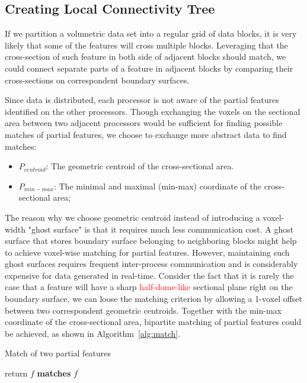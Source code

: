 \subsection{Creating Local Connectivity Tree}

If we partition a volumetric data set into a regular grid of data blocks, it is very likely that some of the features will cross multiple blocks. Leveraging that the cross-section of such feature in both side of adjacent blocks should match, we could connect separate parts of a feature in adjacent blocks by comparing their cross-sections on correspondent boundary surfaces.

Since data is distributed, each processor is not aware of the partial features identified on the other processors. Though exchanging the voxels on the sectional area between two adjacent processors would be sufficient for finding possible matches of partial features, we choose to exchange more abstract data to find matches:

\begin{itemize}
	\item $P_{centroid}$: The geometric centroid of the cross-sectional area.
	\item $P_{min-max}$: The minimal and maximal (min-max) coordinate of the cross-sectional area;
\end{itemize}

The reason why we choose geometric centroid instead of introducing a voxel-width "ghost surface" is that it requires much less communication cost. A ghost surface that stores boundary surface belonging to neighboring blocks might help to achieve voxel-wise matching for partial features. However, maintaining such ghost surfaces requires frequent inter-process communication and is considerably expensive for data generated in real-time. Consider the fact that it is rarely the case that a feature will have a sharp \textcolor{red}{half-dome-like} sectional plane right on the boundary surface, we can loose the matching criterion by allowing a 1-voxel offset between two correspondent geometric centroids. Together with the min-max coordinate of the cross-sectional area, bipartite matching of partial features could be achieved, as shown in Algorithm~\ref{alg:match}.

\begin{algorithm}
\caption{Match of two partial features}
	\begin{algorithmic}
			\STATE return $f$ \textbf{matches} $f^{'}$
		\ENDIF
	\end{algorithmic}
\label{alg:match}
\end{algorithm}

